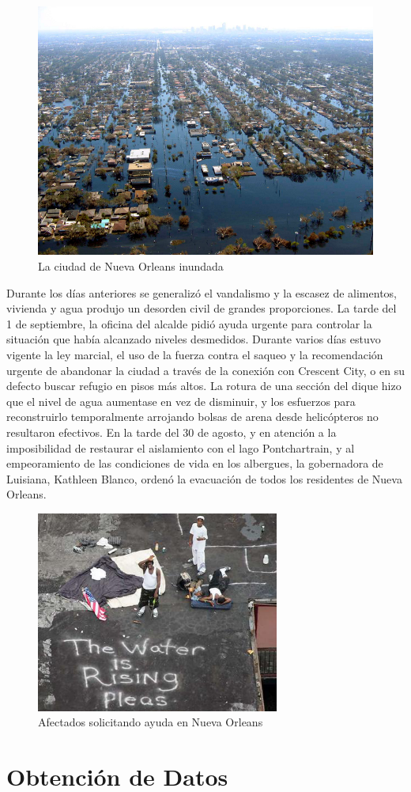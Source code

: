 \begin{figure}[H]
 \centering
 \includegraphics[width=130mm]{figuras/cap0/flood.png}
 \caption{La ciudad de Nueva Orleans inundada}
\end{figure}

Durante los días anteriores se generalizó el vandalismo y la escasez de
alimentos, vivienda y agua produjo un desorden civil de grandes proporciones. La
tarde del 1 de septiembre, la oficina del alcalde pidió ayuda urgente para
controlar la situación que había alcanzado niveles desmedidos. Durante varios
días estuvo vigente la ley marcial, el uso de la fuerza contra el saqueo y la
recomendación urgente de abandonar la ciudad a través de la conexión con
Crescent City, o en su defecto buscar refugio en pisos más altos. La rotura de
una sección del dique hizo que el nivel de agua aumentase en vez de disminuir, y
los esfuerzos para reconstruirlo temporalmente arrojando bolsas de arena desde
helicópteros no resultaron efectivos. En la tarde del 30 de agosto, y en
atención a la imposibilidad de restaurar el aislamiento con el lago
Pontchartrain, y al empeoramiento de las condiciones de vida en los albergues,
la gobernadora de Luisiana, Kathleen Blanco, ordenó la evacuación de todos los
residentes de Nueva Orleans\cite{DeLozier}.

\begin{figure}[H]
 \centering
 \includegraphics[width=80mm]{figuras/cap0/help.png}
 \caption{Afectados solicitando ayuda en Nueva Orleans}
\end{figure}

\section{Obtención de Datos}

